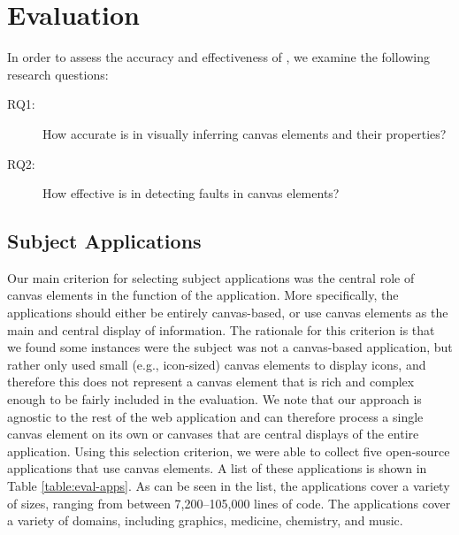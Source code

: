 
\section{Evaluation}\label{sec:evaluation}

In order to assess the accuracy and effectiveness of \tool, we examine the following research questions:

\begin{description}
\item[RQ1:] How accurate is \tool in visually inferring canvas elements and their properties?

\item[RQ2:]  How effective is \tool in detecting faults in canvas elements?
\end{description}

\subsection{Subject Applications}\label{sec:subjects}
Our main criterion for selecting subject applications was the central role of canvas elements in the function of the application. 
More specifically, the applications should either be entirely canvas-based, or use canvas elements as the main and central display of information. The rationale for this criterion is that we found 
some instances were the subject was not a canvas-based application, 
but rather only used small (e.g., icon-sized) canvas elements to display icons, and therefore this does not represent a canvas element that is rich and complex enough to be fairly included in the evaluation. We note that our approach is agnostic to the rest of the web application and can therefore process a single canvas element on its own or canvases that are central displays of the entire application.
Using this selection criterion, we were able to collect five open-source applications that use canvas elements. A list of these applications is shown in Table \ref{table:eval-apps}. As can be seen in the list, the applications cover a variety of sizes, ranging from between 7,200--105,000 lines of code. The applications cover a variety of domains, including graphics, medicine, chemistry, and music.

